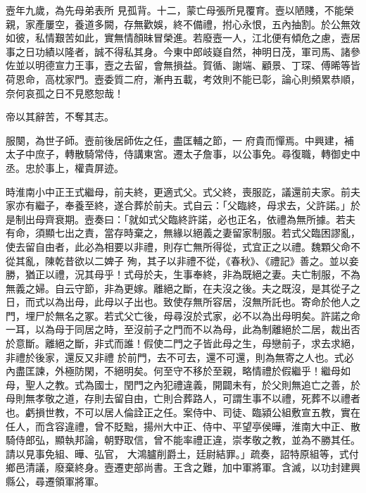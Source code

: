 \begin{pinyinscope}
 壼年九歲，為先母弟表所
 見孤背。十二，蒙亡母張所見覆育。壼以陋賤，不能榮親，家產屢空，養道多闕，存無歡娛，終不備禮，拊心永恨，五內抽割。於公無效如彼，私情艱苦如此，實無情顏昧冒榮進。若廢壼一人，江北便有傾危之慮，壼居事之日功績以隆者，誠不得私其身。今東中郎岐嶷自然，神明日茂，軍司馬、諸參佐並以明德宣力王事，壼之去留，會無損益。賀循、謝端、顧景、丁琛、傅晞等皆荷恩命，高枕家門。壼委質二府，漸冉五載，考效則不能已彰，論心則頻累恭順，奈何哀孤之日不見愍恕哉！



 帝以其辭苦，不奪其志。



 服闋，為世子師。壼前後居師佐之任，盡匡輔之節，一
 府貴而憚焉。中興建，補太子中庶子，轉散騎常侍，侍講東宮。遷太子詹事，以公事免。尋復職，轉御史中丞。忠於事上，權貴屏迹。



 時淮南小中正王式繼母，前夫終，更適式父。式父終，喪服訖，議還前夫家。前夫家亦有繼子，奉養至終，遂合葬於前夫。式自云：「父臨終，母求去，父許諾。」於是制出母齊衰期。壼奏曰：「就如式父臨終許諾，必也正名，依禮為無所據。若夫有命，須顯七出之責，當存時棄之，無緣以絕義之妻留家制服。若式父臨困謬亂，使去留自由者，此必為相要以非禮，則存亡無所得從，式宜正之以禮。魏顆父命不從其亂，陳乾昔欲以二婢子
 殉，其子以非禮不從，《春秋》、《禮記》善之。並以妾勝，猶正以禮，況其母乎！式母於夫，生事奉終，非為既絕之妻。夫亡制服，不為無義之婦。自云守節，非為更嫁。離絕之斷，在夫沒之後。夫之既沒，是其從子之日，而式以為出母，此母以子出也。致使存無所容居，沒無所託也。寄命於他人之門，埋尸於無名之冢。若式父亡後，母尋沒於式家，必不以為出母明矣。許諾之命一耳，以為母于同居之時，至沒前子之門而不以為母，此為制離絕於二居，裁出否於意斷。離絕之斷，非式而誰！假使二門之子皆此母之生，母戀前子，求去求絕，非禮於後家，還反又非禮
 於前門，去不可去，還不可還，則為無寄之人也。式必內盡匡諫，外極防閑，不絕明矣。何至守不移於至親，略情禮於假繼乎！繼母如母，聖人之教。式為國士，閏門之內犯禮違義，開闢未有，於父則無追亡之善，於母則無孝敬之道，存則去留自由，亡則合葬路人，可謂生事不以禮，死葬不以禮者也。虧損世教，不可以居人倫詮正之任。案侍中、司徒、臨潁公組敷宣五教，實在任人，而含容違禮，曾不貶黜，揚州大中正、侍中、平望亭侯曄，淮南大中正、散騎侍郎弘，顯執邦論，朝野取信，曾不能率禮正違，崇孝敬之教，並為不勝其任。請以見事免組、曄、弘官，
 大鴻臚削爵土，廷尉結罪。」疏奏，詔特原組等，式付鄉邑清議，廢棄終身。壼遷吏部尚書。王含之難，加中軍將軍。含滅，以功封建興縣公，尋遷領軍將軍。




\end{pinyinscope}
